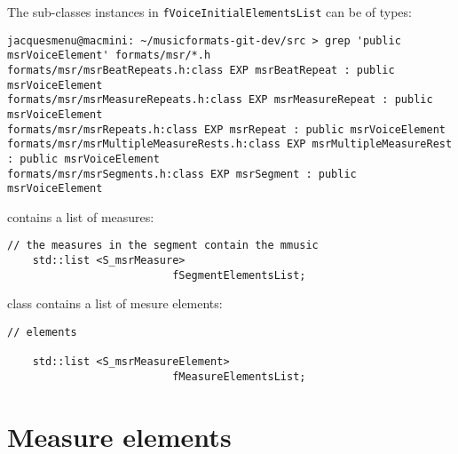 The  sub-classes instances in {\tt fVoiceInitialElementsList} can be of types:
\begin{lstlisting}[language=Terminal]
jacquesmenu@macmini: ~/musicformats-git-dev/src > grep 'public msrVoiceElement' formats/msr/*.h
formats/msr/msrBeatRepeats.h:class EXP msrBeatRepeat : public msrVoiceElement
formats/msr/msrMeasureRepeats.h:class EXP msrMeasureRepeat : public msrVoiceElement
formats/msr/msrRepeats.h:class EXP msrRepeat : public msrVoiceElement
formats/msr/msrMultipleMeasureRests.h:class EXP msrMultipleMeasureRest : public msrVoiceElement
formats/msr/msrSegments.h:class EXP msrSegment : public msrVoiceElement
\end{lstlisting}

 contains a list of measures:
\begin{lstlisting}[language=CPlusPlus]
    // the measures in the segment contain the mmusic
    std::list <S_msrMeasure>
                          fSegmentElementsList;
\end{lstlisting}

class   {\tt } contains a list of mesure elements:
\begin{lstlisting}[language=CPlusPlus]
    // elements

    std::list <S_msrMeasureElement>
                          fMeasureElementsList;
\end{lstlisting}


\section{Measure elements}

